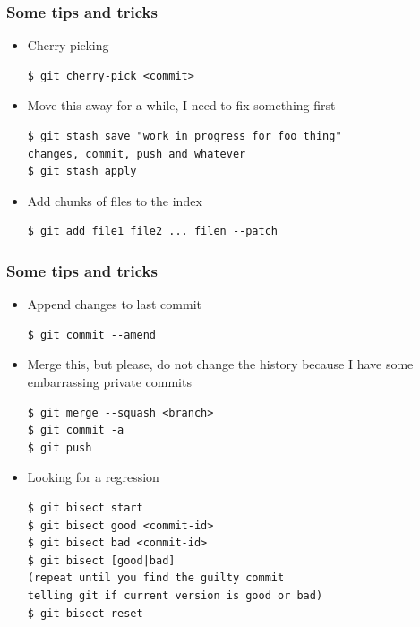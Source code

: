 \begin{frame}[fragile]
  \frametitle{Some tips and tricks}

  \begin{itemize}
  \item Cherry-picking
    {\scriptsize
\begin{verbatim}
$ git cherry-pick <commit>
\end{verbatim}
    }

    \pause

  \item Move this away for a while, I need to fix something first
    {\scriptsize
\begin{verbatim}
$ git stash save "work in progress for foo thing"
changes, commit, push and whatever
$ git stash apply
\end{verbatim}
    }

    \pause

  \item Add chunks of files to the index
    {\scriptsize
\begin{verbatim}
$ git add file1 file2 ... filen --patch
\end{verbatim}
    }

  \end{itemize}
\end{frame}

\begin{frame}[fragile]
  \frametitle{Some tips and tricks}

  \begin{itemize}
  \item Append changes to last commit
    {\scriptsize
\begin{verbatim}
$ git commit --amend
\end{verbatim}
    }

    \pause

  \item Merge this, but please, do not change the history because I
    have some embarrassing private commits
    {\scriptsize
\begin{verbatim}
$ git merge --squash <branch>
$ git commit -a
$ git push
\end{verbatim}
    }

    \pause

  \item Looking for a regression
    {\scriptsize
\begin{verbatim}
$ git bisect start
$ git bisect good <commit-id>
$ git bisect bad <commit-id>
$ git bisect [good|bad]
(repeat until you find the guilty commit 
telling git if current version is good or bad)
$ git bisect reset
\end{verbatim}
    }
    \end{itemize}

\end{frame}


